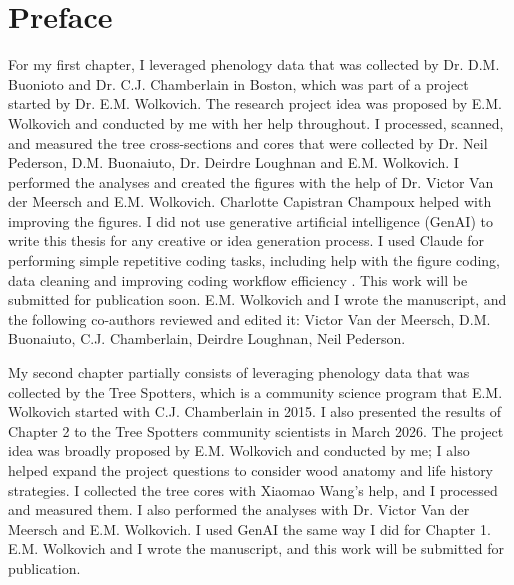 \chapter{Preface}
For my first chapter, I leveraged phenology data that was collected by Dr. D.M. Buonioto and Dr. C.J. Chamberlain in Boston, which was part of a project started by Dr. E.M. Wolkovich. The research project idea was proposed by E.M. Wolkovich and conducted by me with her help throughout. I processed, scanned, and measured the tree cross-sections and cores that were collected by Dr. Neil Pederson, D.M. Buonaiuto, Dr. Deirdre Loughnan and E.M. Wolkovich. I performed the analyses and created the figures with the help of Dr. Victor Van der Meersch and E.M. Wolkovich. Charlotte Capistran Champoux helped with improving the figures. I did not use generative artificial intelligence (GenAI) to write this thesis for any creative or idea generation process. I used Claude for performing simple repetitive coding tasks, including help with the figure coding, data cleaning and improving coding workflow efficiency \citep{anthropic_claude_2026}. This work will be submitted for publication soon. E.M. Wolkovich and I wrote the manuscript, and the following co-authors reviewed and edited it: Victor Van der Meersch, D.M. Buonaiuto, C.J. Chamberlain, Deirdre Loughnan, Neil Pederson.

My second chapter partially consists of leveraging phenology data that was collected by the Tree Spotters, which is a community science program that E.M. Wolkovich started with C.J. Chamberlain in 2015. I also presented the results of Chapter 2 to the Tree Spotters community scientists in March 2026. The project idea was broadly proposed by E.M. Wolkovich and conducted by me; I also helped expand the project questions to consider wood anatomy and life history strategies. I collected the tree cores with Xiaomao Wang's help, and I processed and measured them. I also performed the analyses with Dr. Victor Van der Meersch and E.M. Wolkovich. I used GenAI the same way I did for Chapter 1. E.M. Wolkovich and I wrote the manuscript, and this work will be submitted for publication.



